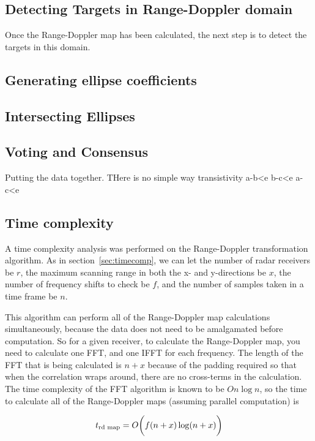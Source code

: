 \documentclass[12pt,openany,a4paper]{book}
\begin{document}
\subsection{Detecting Targets in Range-Doppler domain}
\label{sec:detectT}
Once the Range-Doppler map has been calculated, the next step is to detect the targets in this domain. 

\subsection{Generating ellipse coefficients}
\label{sec:ell1}

\subsection{Intersecting Ellipses}
\label{sec:ell2}


\subsection{Voting and Consensus}
\label{sec:Vote}

Putting the data together. THere is no simple way transistivity a-b<e   b-c<e   a-c<e


\subsection{Time complexity}
A time complexity analysis was performed on the Range-Doppler transformation algorithm. As in section~\ref{sec:timecomp}, we can let the number of radar receivers be $r$, the maximum scanning range in both the x- and y-directions be $x$, the number of frequency shifts to check be $f$, and the number of samples taken in a time frame be $n$.

\bigskip

This algorithm can perform all of the Range-Doppler map calculations simultaneously, because the data does not need to be amalgamated before computation. So for a given receiver, to calculate the Range-Doppler map, you need to calculate one FFT, and one IFFT for each frequency. The length of the FFT that is being calculated is $n+x$ because of the padding required so that when the correlation wraps around, there are no cross-terms in the calculation. The time complexity of the FFT algorithm is known to be $On\log n$, so the time to calculate all of the Range-Doppler maps (assuming parallel computation) is

\begin{equation}
t_{\textnormal{rd map}} = O\bigg(f(n+x) \log (n+x) \bigg)
\end{equation}
\end{document}

